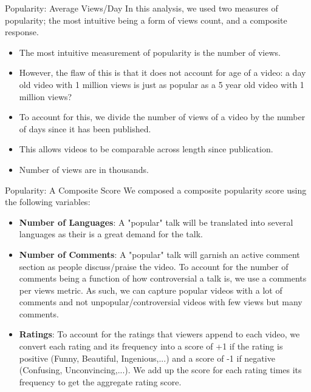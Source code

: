 \begin{frame}{Popularity: Average Views/Day}
	In this analysis, we used two measures of popularity; the most intuitive being a form of views count, and a composite response.
\begin{itemize}
\item The most intuitive measurement of popularity is the number of views. 
\item However, the flaw of this is that it does not account for age of a video: a day old video with 1 million views is just as popular as a 5 year old video with 1 million views?
\item  To account for this, we divide the number of views of a video by the number of days since it has been published. 
\item This allows videos to be comparable across length since publication.
\item  Number of views are in thousands.
\end{itemize}
\end{frame}

\begin{frame}{Popularity: A Composite Score}
We composed a composite popularity score using the following variables:
\begin{itemize}
	\item \textbf{Number of Languages}: A "popular" talk will be translated into several languages as their is a great demand for the talk.
	\item \textbf{Number of Comments}: A "popular" talk will garnish an active comment section as people discuss/praise the video. To account for the number of comments being a function of how controversial a talk is, we use a comments per views metric. As such, we can capture popular videos with a lot of comments and not unpopular/controversial videos with few views but many comments. 
	\item \textbf{Ratings}: To account for the ratings that viewers append to each video, we convert each rating and its frequency into a score of +1 if the rating is positive (Funny, Beautiful, Ingenious,...) and a score of -1 if negative (Confusing, Unconvincing,...). We add up the score for each rating times its frequency to get the aggregate rating score.
\end{itemize}
\end{frame}

